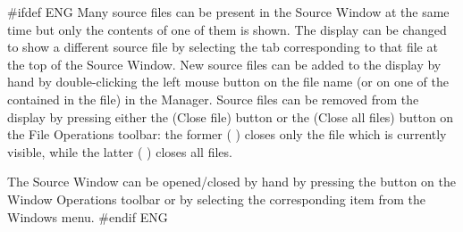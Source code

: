 \documentclass[\pformat,12pt]{article}
\newcommand{\guicmd}[1]{{\sf #1}}
\newcommand{\guicmd}[1]{{\gt #1}}
\begin{document}
#ifdef ENG
Many source files can be present in the \guicmd{Source Window} at the
same time but only the contents of one of them is shown. The display
can be changed to show a different source file by selecting the tab
corresponding to that file at the top of the \guicmd{Source
  Window}. New source files can be added to the display by hand by
double-clicking the left mouse button on the file name (or on one of
the  contained in the
file) in the \guicmd{Manager}. Source files can be removed from the
display by pressing either the 
(\guicmd{Close file}) button or the 
(\guicmd{Close all files}) button on the \guicmd{File Operations}
toolbar: the former (%
)
closes only the file which is currently visible, while the latter (%
)
closes all files.

The \guicmd{Source Window} can be opened/closed by hand by pressing
the  
button on the \guicmd{Window Operations} toolbar or by
selecting the corresponding item from the \guicmd{Windows} menu.
#endif ENG
\end{document}
